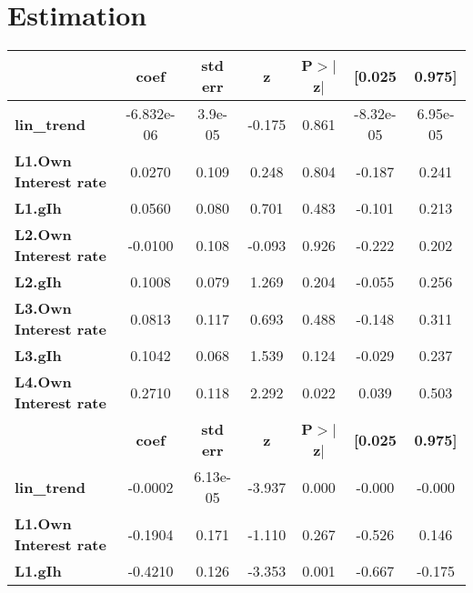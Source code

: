 \documentclass[11pt]{article}
\begin{document}
\section{Estimation}
\label{sec:org85913de}

\begin{center}
\begin{tabular}{lcccccc}
\toprule
                              & \textbf{coef} & \textbf{std err} & \textbf{z} & \textbf{P$> |$z$|$} & \textbf{[0.025} & \textbf{0.975]}  \\
\midrule
\textbf{lin\_trend}           &   -6.832e-06  &      3.9e-05     &    -0.175  &         0.861        &    -8.32e-05    &     6.95e-05     \\
\textbf{L1.Own Interest rate} &       0.0270  &        0.109     &     0.248  &         0.804        &       -0.187    &        0.241     \\
\textbf{L1.gIh}               &       0.0560  &        0.080     &     0.701  &         0.483        &       -0.101    &        0.213     \\
\textbf{L2.Own Interest rate} &      -0.0100  &        0.108     &    -0.093  &         0.926        &       -0.222    &        0.202     \\
\textbf{L2.gIh}               &       0.1008  &        0.079     &     1.269  &         0.204        &       -0.055    &        0.256     \\
\textbf{L3.Own Interest rate} &       0.0813  &        0.117     &     0.693  &         0.488        &       -0.148    &        0.311     \\
\textbf{L3.gIh}               &       0.1042  &        0.068     &     1.539  &         0.124        &       -0.029    &        0.237     \\
\textbf{L4.Own Interest rate} &       0.2710  &        0.118     &     2.292  &         0.022        &        0.039    &        0.503     \\
                              & \textbf{coef} & \textbf{std err} & \textbf{z} & \textbf{P$> |$z$|$} & \textbf{[0.025} & \textbf{0.975]}  \\
\midrule
\textbf{lin\_trend}           &      -0.0002  &     6.13e-05     &    -3.937  &         0.000        &       -0.000    &       -0.000     \\
\textbf{L1.Own Interest rate} &      -0.1904  &        0.171     &    -1.110  &         0.267        &       -0.526    &        0.146     \\
\textbf{L1.gIh}               &      -0.4210  &        0.126     &    -3.353  &         0.001        &       -0.667    &       -0.175     \\

\end{tabular}
\end{center}
\end{document}
